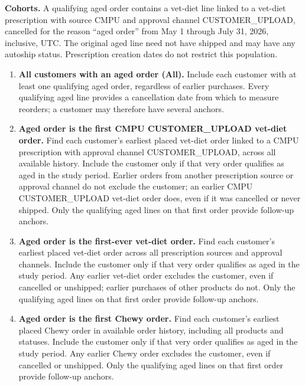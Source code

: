 \label{subsec:medium-term-reorder-behavior}
\noindent\textbf{Cohorts.}
A qualifying aged order contains a
vet-diet line linked to a vet-diet prescription with source CMPU and approval
channel CUSTOMER\_UPLOAD, cancelled for the reason ``aged order'' from
May 1 through July 31, 2026, inclusive, UTC. The original aged line need not
have shipped and may have any autoship status. Prescription creation dates
do not restrict this population.

\begin{enumerate}
\item \textbf{All customers with an aged order (All).} Include each customer
with at least one qualifying aged order, regardless of earlier purchases.
Every qualifying aged line provides a cancellation date from which to
measure reorders; a customer may therefore have several anchors.

\item \textbf{Aged order is the first CMPU CUSTOMER\_UPLOAD vet-diet
order.} Find each customer's earliest placed vet-diet order linked to a
CMPU prescription with approval channel CUSTOMER\_UPLOAD, across all
available history. Include the customer only if that very order qualifies
as aged in the study period. Earlier orders from another prescription
source or approval channel do not exclude the customer; an earlier CMPU
CUSTOMER\_UPLOAD vet-diet order does, even if it was cancelled or never
shipped. Only the qualifying aged lines on that first order provide
follow-up anchors.

\item \textbf{Aged order is the first-ever vet-diet order.} Find each
customer's earliest placed vet-diet order across all prescription sources
and approval channels. Include the customer only if that very order
qualifies as aged in the study period. Any earlier vet-diet order excludes
the customer, even if cancelled or unshipped; earlier purchases of other
products do not. Only the qualifying aged lines on that first order
provide follow-up anchors.

\item \textbf{Aged order is the first Chewy order.} Find each customer's
earliest placed Chewy order in available order history, including all
products and statuses. Include the customer only if that very order
qualifies as aged in the study period. Any earlier Chewy order excludes
the customer, even if cancelled or unshipped. Only the qualifying aged
lines on that first order provide follow-up anchors.
\end{enumerate}


